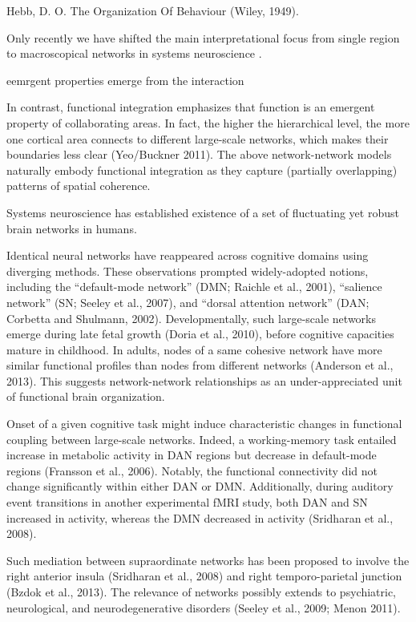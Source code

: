 \documentclass{article} %
\begin{document}
Hebb, D. O. The Organization Of Behaviour (Wiley,
1949).

Only recently we have shifted the main interpretational focus
from single region to macroscopical networks
in systems neuroscience \citep{yuste2015}.


eemrgent properties emerge from the interaction

In
contrast, functional integration emphasizes that function is an
emergent property of collaborating areas. In fact, the higher the
hierarchical level, the more one cortical area connects to different
large-scale networks, which makes their boundaries less clear
(Yeo/Buckner 2011). The above network-network models naturally embody
functional integration as they capture (partially overlapping)
patterns of spatial coherence.

Systems neuroscience has established existence of a
set of fluctuating yet robust brain networks in humans. 


Identical neural networks have reappeared across cognitive domains
using diverging methods. These observations prompted widely-adopted
notions, including the ``default-mode network'' \cite{raichle2001} (DMN; Raichle et al.,
2001), ``salience network'' (SN; Seeley et al., 2007), and ``dorsal
attention network'' (DAN; Corbetta and Shulmann,
2002). Developmentally, such large-scale networks emerge during late
fetal growth (Doria et al., 2010), before cognitive capacities mature
in childhood. In adults, nodes of a same cohesive network have more
similar functional profiles than nodes from different networks
(Anderson et al., 2013).
This
suggests network-network relationships as an under-appreciated unit of
functional brain organization.



Onset of a given cognitive task might induce
characteristic changes in functional coupling between large-scale
networks. Indeed, a working-memory task entailed increase in metabolic
activity in DAN regions but decrease in default-mode regions (Fransson
et al., 2006). Notably, the functional connectivity did not change
significantly within either DAN or DMN. Additionally, during auditory
event transitions in another experimental fMRI study, both DAN and SN
increased in activity, whereas the DMN decreased in activity
(Sridharan et al., 2008). 
 

Such mediation between supraordinate networks
has been proposed to involve the right anterior insula (Sridharan et
al., 2008) and right temporo-parietal junction (Bzdok et al.,
2013).
The relevance of networks
possibly extends to psychiatric, neurological, and neurodegenerative
disorders (Seeley et al., 2009; Menon 2011).
\end{document}
